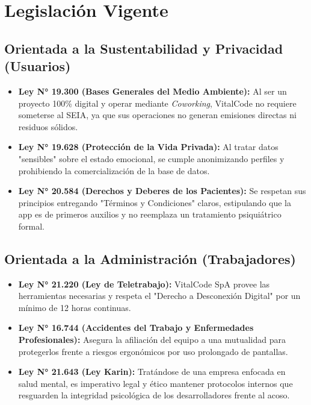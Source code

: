 \documentclass[12pt,letterpaper]{article}
\begin{document}
\section{Legislación Vigente}

\subsection{Orientada a la Sustentabilidad y Privacidad (Usuarios)}
\begin{itemize}[leftmargin=*]
    \item \textbf{Ley N° 19.300 (Bases Generales del Medio Ambiente):} Al ser un proyecto 100\% digital y operar mediante \textit{Coworking}, VitalCode no requiere someterse al SEIA, ya que sus operaciones no generan emisiones directas ni residuos sólidos.
    \item \textbf{Ley N° 19.628 (Protección de la Vida Privada):} Al tratar datos "sensibles" sobre el estado emocional, se cumple anonimizando perfiles y prohibiendo la comercialización de la base de datos.
    \item \textbf{Ley N° 20.584 (Derechos y Deberes de los Pacientes):} Se respetan sus principios entregando "Términos y Condiciones" claros, estipulando que la app es de primeros auxilios y no reemplaza un tratamiento psiquiátrico formal.
\end{itemize}

\subsection{Orientada a la Administración (Trabajadores)}
\begin{itemize}[leftmargin=*]
    \item \textbf{Ley N° 21.220 (Ley de Teletrabajo):} VitalCode SpA provee las herramientas necesarias y respeta el "Derecho a Desconexión Digital" por un mínimo de 12 horas continuas.
    \item \textbf{Ley N° 16.744 (Accidentes del Trabajo y Enfermedades Profesionales):} Asegura la afiliación del equipo a una mutualidad para protegerlos frente a riesgos ergonómicos por uso prolongado de pantallas.
    \item \textbf{Ley N° 21.643 (Ley Karin):} Tratándose de una empresa enfocada en salud mental, es imperativo legal y ético mantener protocolos internos que resguarden la integridad psicológica de los desarrolladores frente al acoso.
\end{itemize}
\end{document}
